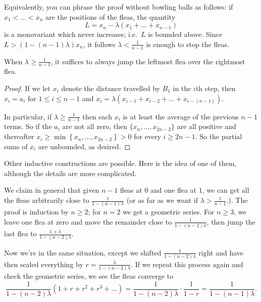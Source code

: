 \begin{remark*}
  Equivalently, you can phrase the proof without
  bowling balls as follows:
  if $x_1 < \dots < x_n$ are the positions of the fleas,
  the quantity
  \[ L = x_n - \lambda(x_1 + \dots + x_{n-1}) \]
  is a monovariant which never increases;
  i.e.\ $L$ is bounded above.
  Since $L > (1-(n-1)\lambda) x_n$, it follows
  $\lambda < \frac{1}{n-1}$ is enough to stop the fleas.
\end{remark*}

\begin{claim*}
When $\lambda \ge \frac{1}{n-1}$,
it suffices to always jump the leftmost flea
over the rightmost flea.
\end{claim*}
\begin{proof}
If we let $x_i$ denote the distance travelled by $B_1$
in the $i$th step,
then $x_i = a_i$ for $1 \le i \le n-1$
and $x_i = \lambda(x_{i-1} + x_{i-2} + \dots + x_{i-(n-1)})$.

In particular, if $\lambda \ge \frac{1}{n-1}$
then each $x_i$ is at least the average of the previous $n-1$ terms.
So if the $a_i$ are not all zero,
then $\{x_{n}, \dots, x_{2n-2}\}$ are all positive
and thereafter $x_i \ge \min \left\{ x_n, \dots, x_{2n-2} \right\} > 0$
for every $i \ge 2n-1$.
So the partial sums of $x_i$ are unbounded, as desired.
\end{proof}

\begin{remark*}
  Other inductive constructions are possible.
  Here is the idea of one of them,
  although the details are more complicated.

  We claim in general that given $n-1$ fleas at $0$
  and one flea at $1$,
  we can get all the fleas arbitrarily close to
  $\frac{1}{1-(n-1)\lambda}$
  (or as far as we want if $\lambda > \frac{1}{n-1}$.).
  The proof is induction by $n \ge 2$;
  for $n=2$ we get a geometric series.
  For $n \ge 3$, we leave one flea at zero
  and move the remainder close to $\frac{1}{1-(n-2)\lambda}$,
  then jump the last flea to
  $\frac{1+\lambda}{1-(n-2)\lambda}$.

  Now we're in the same situation,
  except we shifted $\frac{1}{1-(n-2)\lambda}$ right
  and have then scaled everything by
  $r = \frac{\lambda}{1-(n-2)\lambda}$.
  If we repeat this process again and check the geometric series,
  we see the fleas converge to
  \[ \frac{1}{1-(n-2)\lambda}
    \left( 1 + r + r^2 + r^3 + \dots \right)
    = \frac{1}{1-(n-2)\lambda} \cdot \frac{1}{1-r}
    = \frac{1}{1-(n-1)\lambda}. \]
\end{remark*}
